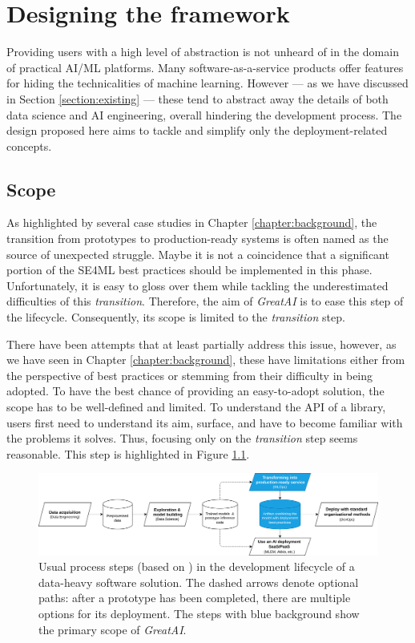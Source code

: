 \chapter{Designing the framework} \label{chapter:design}

Providing users with a high level of abstraction is not unheard of in the domain of practical AI/ML platforms. Many software-as-a-service products offer features for hiding the technicalities of machine learning. However --- as we have discussed in Section \ref{section:existing} --- these tend to abstract away the details of both data science and AI engineering, overall hindering the development process. The design proposed here aims to tackle and simplify only the deployment-related concepts.

\section{Scope} \label{section:scope}

As highlighted by several case studies in Chapter \ref{chapter:background}, the transition from prototypes to production-ready systems is often named as the source of unexpected struggle. Maybe it is not a coincidence that a significant portion of the SE4ML best practices should be implemented in this phase. Unfortunately, it is easy to gloss over them while tackling the underestimated difficulties of this \textit{transition}. Therefore, the aim of \textit{GreatAI} is to ease this step of the lifecycle. Consequently, its scope is limited to the \textit{transition} step.

There have been attempts that at least partially address this issue, however, as we have seen in Chapter \ref{chapter:background}, these have limitations either from the perspective of best practices or stemming from their difficulty in being adopted. To have the best chance of providing an easy-to-adopt solution, the scope has to be well-defined and limited. To understand the API of a library, users first need to understand its aim, surface, and have to become familiar with the problems it solves. Thus, focusing only on the \textit{transition} step seems reasonable. This step is highlighted in Figure \ref{fig:scope}.

\begin{figure}
    \centering
    \includegraphics[width=\linewidth]{figures/scope.drawio.png}
    \captionsetup{width=.9\linewidth}
    \caption{Usual process steps (based on \cite{john2020architecting}) in the development lifecycle of a data-heavy software solution. The dashed arrows denote optional paths: after a prototype has been completed, there are multiple options for its deployment. The steps with blue background show the primary scope of \textit{GreatAI}.}
    \label{fig:scope}
\end{figure}


